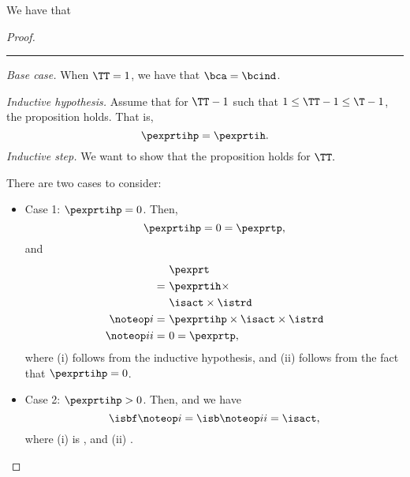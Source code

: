 \begin{proposition}
  We have that %
\end{proposition}

\begin{proof}
  \hrule
  {\it Base case.}
  When $\TT = 1$,
  we have  that
  $\bca = \bcind$.

  \srule
  {\it Inductive hypothesis.}
  Assume that for $\TT - 1$ such that $1 \le \TT - 1 \le \T - 1$,
  the proposition holds. That is,
  $$ \pexprtihp = \pexprtih.$$%
  \srule
  {\it Inductive step.}
  We want to show that the proposition holds for $\TT.$

  There are two cases to consider:
  \begin{itemize}
    \item Case 1: $\pexprtihp = 0$. 
      Then,
      $$\pexprtihp = 0 = \pexprtp,$$
      and
      \begin{align*}
        &\pexprt \\
        =\ &\pexprtih \times \\
        &\isact \times \istrd\\
        \noteop i = \ & \pexprtihp \times \isact \times \istrd \\
        \noteop ii = \ & 0 = \pexprtp,
      \end{align*}
      where (i) follows from the inductive hypothesis,
      and (ii) follows from the fact that $\pexprtihp = 0$.
    \item Case 2: $\pexprtihp > 0$. 
      Then, 
      and we have
      $$\isbf \noteop i = \isb \noteop ii = \isact,$$
      where (i) is , and (ii) .


\end{itemize}
\end{proof}
